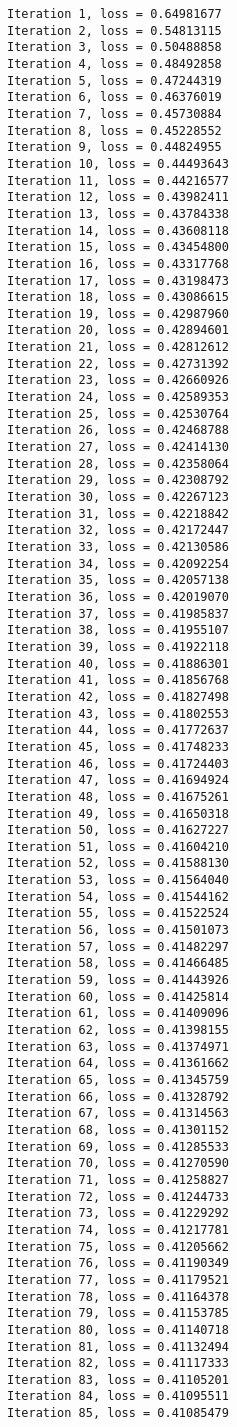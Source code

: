 \documentclass[11pt]{article}
\begin{document}
    \begin{Verbatim}[commandchars=\\\{\}]
Iteration 1, loss = 0.64981677
Iteration 2, loss = 0.54813115
Iteration 3, loss = 0.50488858
Iteration 4, loss = 0.48492858
Iteration 5, loss = 0.47244319
Iteration 6, loss = 0.46376019
Iteration 7, loss = 0.45730884
Iteration 8, loss = 0.45228552
Iteration 9, loss = 0.44824955
Iteration 10, loss = 0.44493643
Iteration 11, loss = 0.44216577
Iteration 12, loss = 0.43982411
Iteration 13, loss = 0.43784338
Iteration 14, loss = 0.43608118
Iteration 15, loss = 0.43454800
Iteration 16, loss = 0.43317768
Iteration 17, loss = 0.43198473
Iteration 18, loss = 0.43086615
Iteration 19, loss = 0.42987960
Iteration 20, loss = 0.42894601
Iteration 21, loss = 0.42812612
Iteration 22, loss = 0.42731392
Iteration 23, loss = 0.42660926
Iteration 24, loss = 0.42589353
Iteration 25, loss = 0.42530764
Iteration 26, loss = 0.42468788
Iteration 27, loss = 0.42414130
Iteration 28, loss = 0.42358064
Iteration 29, loss = 0.42308792
Iteration 30, loss = 0.42267123
Iteration 31, loss = 0.42218842
Iteration 32, loss = 0.42172447
Iteration 33, loss = 0.42130586
Iteration 34, loss = 0.42092254
Iteration 35, loss = 0.42057138
Iteration 36, loss = 0.42019070
Iteration 37, loss = 0.41985837
Iteration 38, loss = 0.41955107
Iteration 39, loss = 0.41922118
Iteration 40, loss = 0.41886301
Iteration 41, loss = 0.41856768
Iteration 42, loss = 0.41827498
Iteration 43, loss = 0.41802553
Iteration 44, loss = 0.41772637
Iteration 45, loss = 0.41748233
Iteration 46, loss = 0.41724403
Iteration 47, loss = 0.41694924
Iteration 48, loss = 0.41675261
Iteration 49, loss = 0.41650318
Iteration 50, loss = 0.41627227
Iteration 51, loss = 0.41604210
Iteration 52, loss = 0.41588130
Iteration 53, loss = 0.41564040
Iteration 54, loss = 0.41544162
Iteration 55, loss = 0.41522524
Iteration 56, loss = 0.41501073
Iteration 57, loss = 0.41482297
Iteration 58, loss = 0.41466485
Iteration 59, loss = 0.41443926
Iteration 60, loss = 0.41425814
Iteration 61, loss = 0.41409096
Iteration 62, loss = 0.41398155
Iteration 63, loss = 0.41374971
Iteration 64, loss = 0.41361662
Iteration 65, loss = 0.41345759
Iteration 66, loss = 0.41328792
Iteration 67, loss = 0.41314563
Iteration 68, loss = 0.41301152
Iteration 69, loss = 0.41285533
Iteration 70, loss = 0.41270590
Iteration 71, loss = 0.41258827
Iteration 72, loss = 0.41244733
Iteration 73, loss = 0.41229292
Iteration 74, loss = 0.41217781
Iteration 75, loss = 0.41205662
Iteration 76, loss = 0.41190349
Iteration 77, loss = 0.41179521
Iteration 78, loss = 0.41164378
Iteration 79, loss = 0.41153785
Iteration 80, loss = 0.41140718
Iteration 81, loss = 0.41132494
Iteration 82, loss = 0.41117333
Iteration 83, loss = 0.41105201
Iteration 84, loss = 0.41095511
Iteration 85, loss = 0.41085479

    \end{Verbatim}
\end{document}
